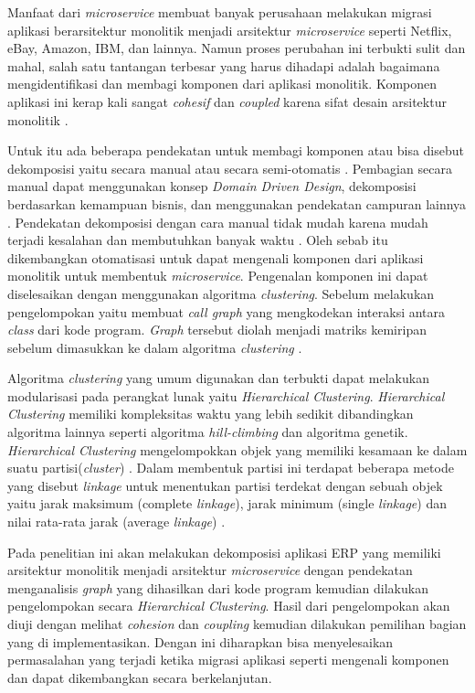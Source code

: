Manfaat dari \textit{microservice} membuat banyak perusahaan melakukan migrasi aplikasi berarsitektur monolitik menjadi arsitektur \textit{microservice} seperti Netflix, eBay, Amazon, IBM, dan lainnya. Namun proses perubahan ini terbukti sulit dan mahal, salah satu tantangan terbesar yang harus dihadapi adalah bagaimana mengidentifikasi dan membagi komponen dari aplikasi monolitik. Komponen aplikasi ini kerap kali sangat \textit{cohesif} dan  \textit{coupled} karena sifat desain arsitektur monolitik \cite{ECD}.

Untuk itu ada beberapa pendekatan untuk membagi komponen atau bisa disebut dekomposisi yaitu secara manual atau secara semi-otomatis \cite{5B1}. Pembagian secara manual dapat menggunakan konsep \textit{Domain Driven Design}, dekomposisi berdasarkan kemampuan bisnis, dan menggunakan pendekatan campuran lainnya \cite{6C1}. Pendekatan dekomposisi dengan cara manual tidak mudah karena mudah terjadi kesalahan dan membutuhkan banyak waktu  \cite{5B1}. Oleh sebab itu dikembangkan otomatisasi untuk dapat mengenali komponen dari aplikasi monolitik untuk membentuk \textit{microservice}. Pengenalan komponen ini dapat diselesaikan dengan menggunakan algoritma \textit{clustering}. Sebelum melakukan pengelompokan yaitu membuat \textit{call graph} yang mengkodekan interaksi antara \textit{class} dari kode program. \textit{Graph} tersebut diolah menjadi matriks kemiripan sebelum dimasukkan ke dalam algoritma \textit{clustering} \cite{ECD}.

Algoritma \textit{clustering} yang umum digunakan dan terbukti dapat melakukan modularisasi pada perangkat lunak yaitu \textit{Hierarchical Clustering}. \textit{Hierarchical Clustering} memiliki kompleksitas waktu yang lebih sedikit dibandingkan algoritma lainnya seperti algoritma \textit{hill-climbing} dan algoritma genetik. \textit{Hierarchical Clustering} mengelompokkan objek yang memiliki kesamaan ke dalam suatu partisi(\textit{cluster}) \cite{8EA}. Dalam membentuk partisi ini terdapat beberapa metode yang disebut \textit{linkage} untuk menentukan partisi terdekat dengan sebuah objek yaitu  jarak maksimum (complete \textit{linkage}), jarak minimum (single \textit{linkage}) dan nilai rata-rata jarak (average \textit{linkage}) \cite{3D3}.

Pada penelitian ini akan melakukan dekomposisi aplikasi ERP yang memiliki arsitektur monolitik menjadi arsitektur \textit{microservice} dengan pendekatan menganalisis \textit{graph} yang dihasilkan dari kode program kemudian dilakukan pengelompokan secara \textit{Hierarchical Clustering}. Hasil dari pengelompokan akan diuji dengan melihat \textit{cohesion} dan \textit{coupling} kemudian dilakukan pemilihan bagian yang di implementasikan. Dengan ini diharapkan bisa menyelesaikan permasalahan yang terjadi ketika migrasi aplikasi seperti  mengenali komponen dan dapat dikembangkan secara berkelanjutan.

